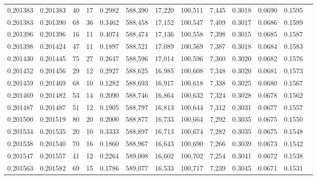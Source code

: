 \begin{tabular}{rrrrrrrrrrrrr}
0.201383 & 0.201383 &    40 &  17 &                                     0.2982 & 588,390 &  17,220 & 100,511 &   7,445 & 0.3018 & 0.0690 & 0.1595 \\
0.201383 & 0.201390 &    68 &  36 &                                     0.3462 & 588,458 &  17,152 & 100,547 &   7,409 & 0.3017 & 0.0686 & 0.1589 \\
0.201396 & 0.201396 &    16 &  11 &                                     0.4074 & 588,474 &  17,136 & 100,558 &   7,398 & 0.3015 & 0.0685 & 0.1587 \\
0.201398 & 0.201424 &    47 &  11 &                                     0.1897 & 588,521 &  17,089 & 100,569 &   7,387 & 0.3018 & 0.0684 & 0.1583 \\
0.201430 & 0.201445 &    75 &  27 &                                     0.2647 & 588,596 &  17,014 & 100,596 &   7,360 & 0.3020 & 0.0682 & 0.1576 \\
0.201452 & 0.201456 &    29 &  12 &                                     0.2927 & 588,625 &  16,985 & 100,608 &   7,348 & 0.3020 & 0.0681 & 0.1573 \\
0.201459 & 0.201469 &    68 &  10 &                                     0.1282 & 588,693 &  16,917 & 100,618 &   7,338 & 0.3025 & 0.0680 & 0.1567 \\
0.201469 & 0.201482 &    53 &  14 &                                     0.2090 & 588,746 &  16,864 & 100,632 &   7,324 & 0.3028 & 0.0678 & 0.1562 \\
0.201487 & 0.201487 &    51 &  12 &                                     0.1905 & 588,797 &  16,813 & 100,644 &   7,312 & 0.3031 & 0.0677 & 0.1557 \\
0.201500 & 0.201519 &    80 &  20 &                                     0.2000 & 588,877 &  16,733 & 100,664 &   7,292 & 0.3035 & 0.0675 & 0.1550 \\
0.201534 & 0.201535 &    20 &  10 &                                     0.3333 & 588,897 &  16,713 & 100,674 &   7,282 & 0.3035 & 0.0675 & 0.1548 \\
0.201538 & 0.201540 &    70 &  16 &                                     0.1860 & 588,967 &  16,643 & 100,690 &   7,266 & 0.3039 & 0.0673 & 0.1542 \\
0.201547 & 0.201557 &    41 &  12 &                                     0.2264 & 589,008 &  16,602 & 100,702 &   7,254 & 0.3041 & 0.0672 & 0.1538 \\
0.201563 & 0.201582 &    69 &  15 &                                     0.1786 & 589,077 &  16,533 & 100,717 &   7,239 & 0.3045 & 0.0671 & 0.1531 \\

\end{tabular}
